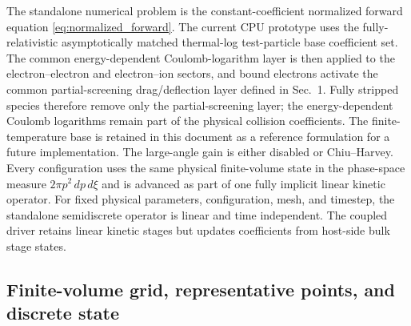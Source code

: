 \documentclass[11pt]{article}
\begin{document}
The standalone numerical problem is the constant-coefficient normalized forward equation
\eqref{eq:normalized_forward}.  The current CPU prototype uses the fully-relativistic
asymptotically matched thermal-log test-particle base coefficient set.  The common
energy-dependent Coulomb-logarithm layer is then applied to the electron--electron and
electron--ion sectors, and bound electrons activate the common partial-screening
drag/deflection layer defined in Sec.~1.  Fully stripped species therefore remove only
the partial-screening layer; the energy-dependent Coulomb logarithms remain part of the
physical collision coefficients.  The finite-temperature base is retained in this
document as a reference formulation for a future implementation.
The large-angle gain is either disabled or Chiu--Harvey.  Every configuration uses the same physical
finite-volume state in the phase-space measure $2\pi p^2\,dp\,d\xi$ and is advanced as
part of one fully implicit linear kinetic operator.  For fixed physical parameters,
configuration, mesh, and timestep, the standalone semidiscrete operator is linear and
time independent.  The coupled driver retains linear kinetic stages but updates
coefficients from host-side bulk stage states.

\subsection{Finite-volume grid, representative points, and discrete state}
\end{document}

